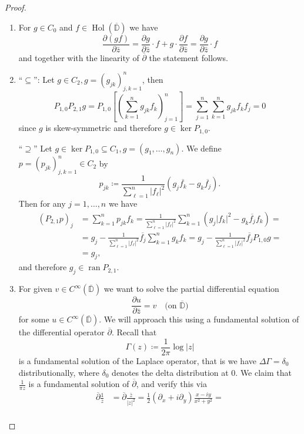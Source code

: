 \documentclass[letterpaper, 11pt]{article}
\newcommand{\D}{\mathbb{D}}
\newcommand{\1}{\mathds{1}}
\newcommand{\cl}[1]{\overline{#1}}
\newcommand{\wirtzbar}{\overline{\partial}}
\DeclareMathOperator*{\ran}{ran}
\DeclareMathOperator*{\Hol}{Hol}
\theoremstyle{definition}
\begin{document}
\begin{proof}{\ }
  \begin{enumerate}
    \item For $g \in C_0$ and $f \in \Hol(\cl{\D})$ we have
    $$ \frac{\partial (gf)}{\partial \bar{z}} = \frac{\partial g}{\partial \bar{z}} \cdot f + g \cdot \frac{\partial f}{\partial \bar{z}} = \frac{\partial g}{\partial \bar{z}} \cdot f $$
    and together with the linearity of $\wirtzbar$ the statement follows.
    \item ``$\subseteq$'': Let $g \in C_2, g = (g_{jk})_{j,k=1}^n$, then
    $$ P_{1,0} P_{2,1} g = P_{1,0} \left[ \left( \sum_{k=1}^n g_{jk} f_k \right)_{j=1}^n \right] = \sum_{j=1}^n \sum_{k=1}^n g_{jk} f_k f_j = 0 $$
    since $g$ is skew-symmetric and therefore $g \in \ker P_{1,0}$.

    ``$\supseteq$'' Let $g \in \ker P_{1,0} \subseteq C_1, g = (g_1, \dots, g_n)$. We define $p = (p_{jk})_{j,k=1}^n \in C_2$ by
    $$ p_{jk} \coloneqq \frac{1}{\displaystyle\sum_{\ell=1}^n \vert f_\ell \vert^2} (g_j \overline{f_k} - g_k \overline{f_j}). $$
    Then for any $j=1,\dots,n$ we have
    \begin{align*}
      (P_{2,1} p)_j &= \sum_{k=1}^n p_{jk} f_k = \frac{1}{\displaystyle\sum_{\ell=1}^n \vert f_\ell \vert^2} \sum_{k=1}^n (g_j \vert f_k \vert^2 - g_k \overline{f_j} f_k) = \\
      &= g_j - \frac{1}{\displaystyle\sum_{\ell=1}^n \vert f_\ell \vert^2} \overline{f_j} \sum_{k=1}^n g_k f_k = g_j - \frac{1}{\displaystyle\sum_{\ell=1}^n \vert f_\ell \vert^2} \overline{f_j} P_{1,0} g = \\
      &= g_j,
    \end{align*}
    and therefore $g_j \in \ran P_{2,1}$.
    \item For given $v \in C^\infty(\cl{\D})$ we want to solve the partial differential equation
    $$ \frac{\partial u}{\partial \bar{z}} = v \quad \textrm{(on $\cl\D$)} $$
    for some $u \in C^\infty(\cl{\D})$. We will approach this using a fundamental solution of the differential operator $\wirtzbar$. Recall that
    $$ \Gamma(z) \coloneqq \frac{1}{2 \pi} \log \vert z \vert $$
    is a fundamental solution of the Laplace operator, that is we have $\Delta \Gamma = \delta_0$ distributionally, where $\delta_0$ denotes the delta distribution at 0. We claim that $\frac{1}{\pi z}$ is a fundamental solution of $\wirtzbar$, and verify this via
    \begin{align*}
      \wirtzbar \frac{1}{z} &= \wirtzbar \frac{\bar{z}}{\vert z \vert^2} = \frac{1}{2} (\partial_x + i \partial_y) \frac{x - i y}{x^2 + y^2} = \\

\end{align*}
\end{enumerate}
\end{proof}
\end{document}
